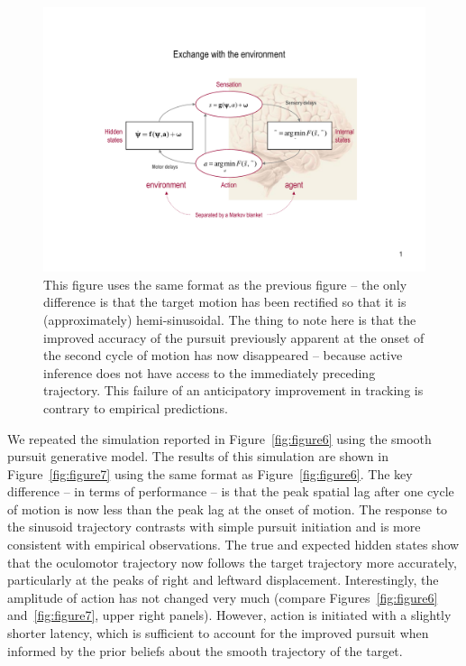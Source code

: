 \documentclass[a4paper]{article} %
\begin{document}
\begin{figure}%
 \centerline{%
 \includegraphics[width=.8\columnwidth, clip, trim = 5.5cm .5cm 6.5cm .4cm, page=8]{Figures_slides.pdf} %
}%
\caption{This figure uses the same format as the previous
figure -- the only difference is that the target motion has been
rectified so that it is (approximately) hemi-sinusoidal. The thing to
note here is that the improved accuracy of the pursuit previously
apparent at the onset of the second cycle of motion has now disappeared
-- because active inference does not have access to the immediately
preceding trajectory. This failure of an anticipatory improvement in
tracking is contrary to empirical predictions.}%
\label{fig:figure8}
\end{figure}

We repeated the simulation reported in Figure~\ref{fig:figure6} using the smooth pursuit
generative model. The results of this simulation are shown in Figure~\ref{fig:figure7}
using the same format as Figure~\ref{fig:figure6}. The key difference -- in terms of
performance -- is that the peak spatial lag after one cycle of motion is
now less than the peak lag at the onset of motion. The response to the
sinusoid trajectory contrasts with simple pursuit initiation and is more
consistent with empirical observations. The true and expected hidden
states show that the oculomotor trajectory now follows the target
trajectory more accurately, particularly at the peaks of right and
leftward displacement. Interestingly, the amplitude of action has not
changed very much (compare Figures~\ref{fig:figure6} and~\ref{fig:figure7}, upper right panels).
However, action is initiated with a slightly shorter latency, which is
sufficient to account for the improved pursuit when informed by the
prior beliefs about the smooth trajectory of the target.
\end{document}

